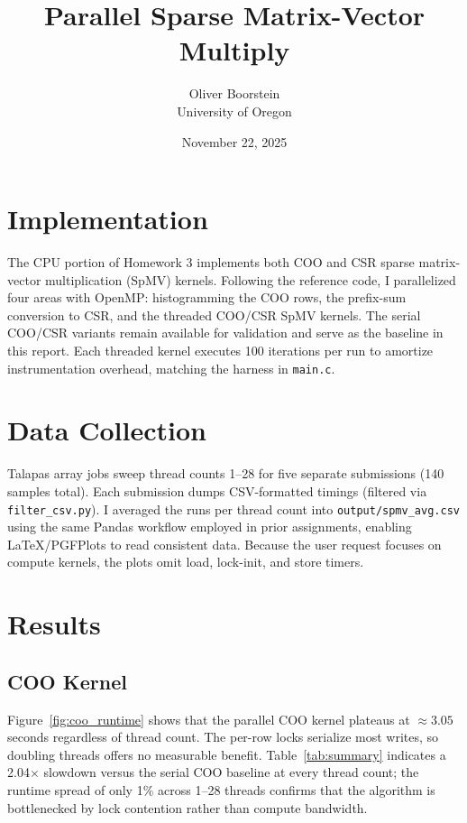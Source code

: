 \documentclass[11pt]{article}
\title{Parallel Sparse Matrix-Vector Multiply}
\author{Oliver Boorstein \\ University of Oregon}
\date{November 22, 2025}
\begin{document}
\twocolumn[
  \maketitle
  \vspace{-1em}
]

\section{Implementation}
The CPU portion of Homework 3 implements both COO and CSR sparse matrix-vector multiplication (SpMV) kernels. Following the reference code, I parallelized four areas with OpenMP: histogramming the COO rows, the prefix-sum conversion to CSR, and the threaded COO/CSR SpMV kernels. The serial COO/CSR variants remain available for validation and serve as the baseline in this report. Each threaded kernel executes 100 iterations per run to amortize instrumentation overhead, matching the harness in \texttt{main.c}.

\section{Data Collection}
Talapas array jobs sweep thread counts 1--28 for five separate submissions (140 samples total). Each submission dumps CSV-formatted timings (filtered via \texttt{filter\_csv.py}). I averaged the runs per thread count into \texttt{output/spmv\_avg.csv} using the same Pandas workflow employed in prior assignments, enabling \LaTeX/PGFPlots to read consistent data. Because the user request focuses on compute kernels, the plots omit load, lock-init, and store timers.

\section{Results}
\subsection{COO Kernel}
Figure~\ref{fig:coo_runtime} shows that the parallel COO kernel plateaus at $\approx3.05$ seconds regardless of thread count. The per-row locks serialize most writes, so doubling threads offers no measurable benefit. Table~\ref{tab:summary} indicates a 2.04$\times$ slowdown versus the serial COO baseline at every thread count; the runtime spread of only 1\% across 1--28 threads confirms that the algorithm is bottlenecked by lock contention rather than compute bandwidth.
\end{document}
